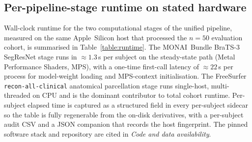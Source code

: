 \documentclass[a4paper,11pt,leqno]{article}
\begin{document}
\vspace{2mm}

\subsection*{Per-pipeline-stage runtime on stated hardware}

Wall-clock runtime for the two computational stages of the
unified pipeline, measured on the same Apple~Silicon host that
processed the $n=50$ evaluation cohort, is summarised in
Table~\ref{table:runtime}. The MONAI~Bundle BraTS-3 SegResNet stage
runs in $\approx\!1.3$\,s per subject on the steady-state path
(Metal Performance Shaders, MPS), with a one-time first-call latency
of $\approx\!22$\,s per process for model-weight loading and
MPS-context initialisation. The FreeSurfer
\texttt{recon-all-clinical} anatomical parcellation stage runs
single-host, multi-threaded on CPU and is the dominant contributor
to total cohort runtime. Per-subject elapsed time is captured as a
structured field in every per-subject sidecar so the table is fully
regenerable from the on-disk derivatives, with a per-subject audit
CSV and a JSON companion that records the host fingerprint. The
pinned software stack and repository are cited in \emph{Code and data
availability}.

\begin{table}[H]
\centering

\vspace{2mm}
\caption{\textbf{Per-pipeline-stage wall-clock runtime on stated
hardware ($n=50$ evaluation cohort).} Auto-generated from the
per-subject elapsed-time fields in the on-disk derivatives. The DL
segmentation stage is split into a single
``first-call latency'' row (cold-start cost paid once per process
for MONAI~Bundle weight loading and MPS-context initialisation) and
a ``steady-state'' row (the remaining $n{-}1$ subjects). Cells
report median followed by the $[$Q1, Q3$]$ inter-quartile range,
auto-formatted as seconds, MM:SS, or HH:MM:SS depending on
magnitude. The $n$ column reports cells where data are present out
of the cohort total ($n_{\text{used}}/n_{\text{expected}}$ when
different); a partial-cohort denominator on the parcellation row
indicates that the long-running FreeSurfer fan-out was still in
flight when this table was last regenerated. Re-running the runtime
benchmark after the fan-out completes refreshes all cells in
place.}
\label{table:runtime}
\end{table}

\vspace{2mm}
\end{document}

